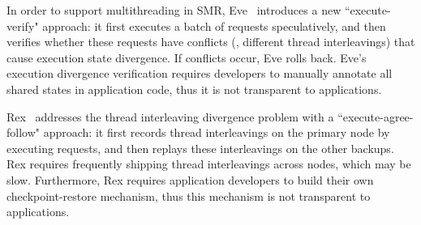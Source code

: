 In order to support multithreading in SMR, Eve~\cite{eve:osdi12} introduces a 
new ``execute-verify" approach: it first executes a batch of requests 
speculatively, and then verifies whether these requests have conflicts (\eg, 
different thread interleavings) that cause execution state divergence. If 
conflicts occur, Eve rolls back. Eve's execution divergence verification 
requires developers to manually annotate all shared states in application code, 
thus it is not transparent to applications.

Rex~\cite{rex:eurosys14} addresses the thread interleaving divergence problem 
with a ``execute-agree-follow" approach: it first records thread interleavings 
on the primary node by executing requests, and then replays these interleavings 
on the other backups. Rex requires frequently shipping thread interleavings 
across nodes, which may be slow. Furthermore, Rex requires application 
developers to build their own checkpoint-restore mechanism, thus this mechanism 
is not transparent to applications.


